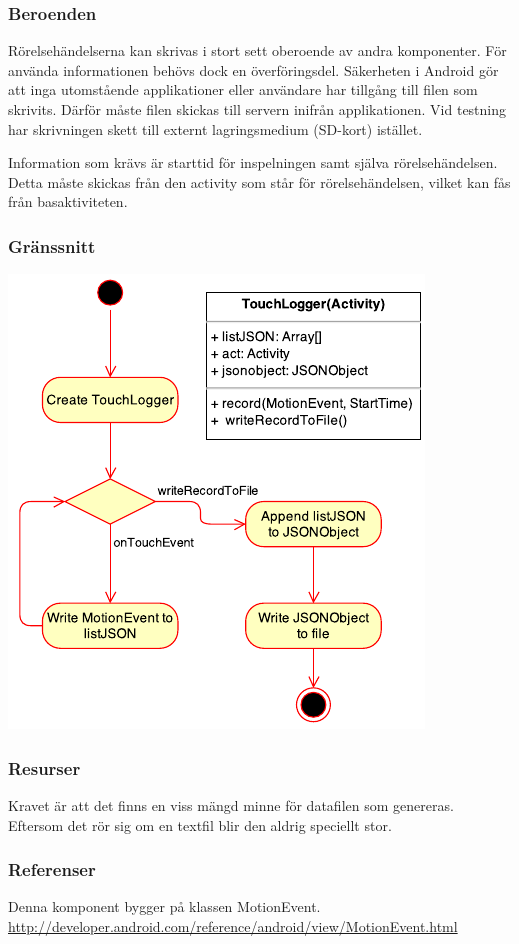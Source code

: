 \subsubsection{Beroenden}
Rörelsehändelserna kan skrivas i stort sett oberoende av andra komponenter. För använda informationen behövs dock en överföringsdel. Säkerheten i Android gör att inga utomstående applikationer eller användare har tillgång till filen som skrivits. Därför måste filen skickas till servern inifrån applikationen. Vid testning har skrivningen skett till externt lagringsmedium (SD-kort) istället.

Information som krävs är starttid för inspelningen samt själva rörelsehändelsen. Detta måste skickas från den activity som står för rörelsehändelsen, vilket kan fås från basaktiviteten.
\subsubsection{Gränssnitt}
\includegraphics[scale=1.0]{TouchLogger.pdf}
\subsubsection{Resurser}
Kravet är att det finns en viss mängd minne för datafilen som genereras. Eftersom det rör sig om en textfil blir den aldrig speciellt stor.
\subsubsection{Referenser}
Denna komponent bygger på klassen MotionEvent.
\url{http://developer.android.com/reference/android/view/MotionEvent.html}
